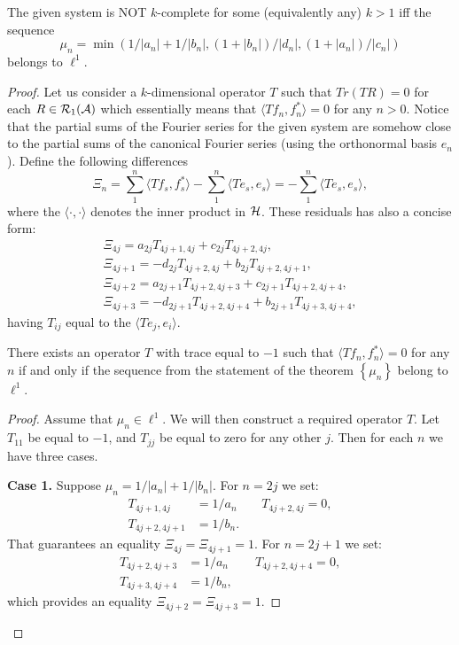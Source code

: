 \documentclass[12pt]{amsart}
\theoremstyle{case}
\begin{document}
  \begin{theorem}
      The given system is NOT $k$-complete for some (equivalently any) $k > 1$ iff the sequence
      \[
        \mu_n = \min(1/|a_n| + 1/|b_n|, (1 + |b_n|)/|d_n|, (1 + |a_n|)/|c_n|)
      \]
        belongs to $\ell^1$.
  \end{theorem}
  \begin{proof}
      Let us consider a $k$-dimensional operator $T$ such that 
        $Tr(TR) = 0$ for each $R \in \cal{R}_1(\cal{A})$ which essentially means that
        $\langle Tf_n, f_n^* \rangle = 0$ for any $n > 0$. 
      Notice that the partial sums of the Fourier series for the given system are somehow close to the
        partial sums of the canonical Fourier series (using the orthonormal basis $e_n$).
      Define the following differences
      \[
        \Xi_n = \sum_1^n \langle Tf_s, f_s^* \rangle - \sum_1^n \langle Te_s, e_s \rangle = -\sum_1^n \langle Te_s, e_s \rangle,
      \]
        where the $\langle \cdot, \cdot\rangle$ denotes the inner product in $\cal{H}$.
      These residuals has also a concise form:
      \begin{align*}
        \Xi_{4j} = a_{2j} T_{4j+1, 4j} + c_{2j} T_{4j+2, 4j},\\
        \Xi_{4j + 1} = -d_{2j} T_{4j+2, 4j} + b_{2j} T_{4j+2, 4j+1},\\
        \Xi_{4j + 2} = a_{2j+1} T_{4j+2, 4j+3} + c_{2j+1} T_{4j+2, 4j+4},\\
        \Xi_{4j + 3} = -d_{2j+1} T_{4j+2, 4j+4} + b_{2j+1} T_{4j+3, 4j+4},
      \end{align*}
      having $T_{ij}$ equal to the $\langle Te_j, e_i \rangle$.
      \begin{prop}
        \label{inf-dim-statement}
        There exists an operator $T$ with trace equal to $-1$ such that
          $\langle Tf_n, f_n^*\rangle = 0$ for any $n$ if and only if the
          sequence from the statement of the theorem $\left\{\mu_n\right\}$ belong to $\ell^1$.
      \end{prop}
      \begin{proof}
        Assume that $\mu_n \in \ell^1$.
        We will then construct a required operator $T$.
        Let $T_{11}$ be equal to $-1$, and $T_{jj}$ be equal to zero for any other $j$.
        Then for each $n$ we have three cases.

        \noindent\textbf{Case 1.} Suppose $\mu_n = 1/|a_n| + 1/|b_n|$. For $n=2j$ we set:
        \begin{align*}
          T_{4j+1,4j}&=1/a_n & \quad T_{4j+2,4j} = 0,\\
          T_{4j+2,4j+1}&=1/b_n.
        \end{align*}
        That guarantees an equality $\Xi_{4j} = \Xi_{4j+1} = 1$.
        For $n=2j+1$ we set:
        \begin{align*}
          T_{4j+2,4j+3}&=1/a_n & \quad T_{4j+2,4j+4} = 0,\\
          T_{4j+3,4j+4}&=1/b_n,
        \end{align*}
        which provides an equality $\Xi_{4j+2} = \Xi_{4j+3} = 1$.


\end{proof}
\end{proof}
\end{document}

